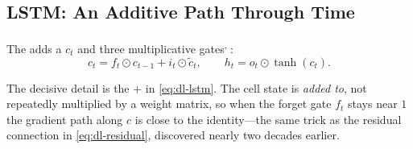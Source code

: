 \subsection{LSTM: An Additive Path Through Time}

The  adds a  $c_t$ and three multiplicative
gates\textsuperscript{\cite{hochreiterLongShortTermMemory1997},
\cite[][pp.~59--61]{fleuretLittleBookDeep}}:
\begin{equation}
  c_t = f_t\odot c_{t-1} + i_t\odot\tilde c_t,
  \qquad
  h_t = o_t\odot\tanh(c_t).
  \label{eq:dl-lstm}
\end{equation}

The decisive detail is the $+$ in \cref{eq:dl-lstm}. The cell state is
\emph{added to}, not repeatedly multiplied by a weight matrix, so when the
forget gate $f_t$ stays near $1$ the gradient path along $c$ is close to the
identity---the same trick as the residual connection in
\cref{eq:dl-residual}, discovered nearly two decades earlier.

